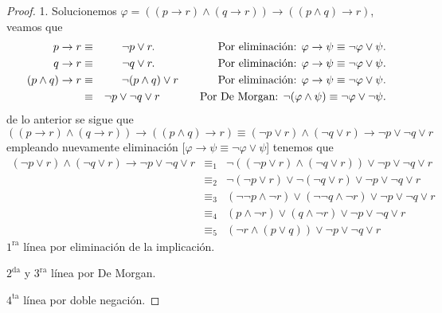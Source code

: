 \documentclass{article}
\begin{document}
\begin{itemize}
\begin{proof}
    1. Solucionemos $\varphi = ((p \rightarrow r) \land (q \rightarrow r)) \rightarrow ((p \land q) \rightarrow r)$,
    veamos que
    \begin{eqnarray*}
      p \rightarrow r &\equiv& \neg p \lor r.
      \hspace*{2cm} \text{Por eliminación: } \varphi \rightarrow \psi \equiv \neg \varphi \lor \psi.\\
      q \rightarrow r &\equiv& \neg q \lor r.
      \hspace*{2cm} \text{Por eliminación: } \varphi \rightarrow \psi \equiv \neg \varphi \lor \psi.\\
      (p \land q) \rightarrow r &\equiv& \neg (p \land q) \lor r
      \hspace*{1.25cm} \text{Por eliminación: } \varphi \rightarrow \psi \equiv \neg \varphi \lor \psi.\\
      &\equiv& \neg p \lor \neg q \lor r
      \hspace*{1.27cm} \text{Por De Morgan: } \neg (\varphi \land \psi) \equiv \neg \varphi \lor \neg \psi.\\
    \end{eqnarray*}
    de lo anterior se sigue que
    \[
    ((p \rightarrow r) \land (q \rightarrow r)) \rightarrow ((p \land q) \rightarrow r)
    \equiv (\neg p \lor r) \land (\neg q \lor r) \rightarrow \neg p \lor \neg q \lor r
    \]
    empleando nuevamente eliminación [$\varphi \rightarrow \psi \equiv \neg \varphi \lor \psi$]
    tenemos que
    \begin{eqnarray*}
    (\neg p \lor r) \land (\neg q \lor r) \rightarrow \neg p \lor \neg q \lor r &\equiv_{1}&
      \neg ((\neg p \lor r) \land (\neg q \lor r)) \lor \neg p \lor \neg q \lor r\\
      &\equiv_{2}& \neg (\neg p \lor r) \lor \neg (\neg q \lor r) \lor \neg p \lor \neg q \lor r\\
      &\equiv_{3}& (\neg\neg p \land \neg r) \lor (\neg\neg q \land \neg r) \lor \neg p \lor \neg q \lor r\\
      &\equiv_{4}& (p \land \neg r) \lor (q \land \neg r) \lor \neg p \lor \neg q \lor r\\
      &\equiv_{5}& (\neg r \land (p \lor q)) \lor \neg p \lor \neg q \lor r
    \end{eqnarray*}
    $1^{\text{ra}}$ línea por eliminación de la implicación.
    
    $2^{\text{da}}$ y $3^{\text{ra}}$ línea por De Morgan.
    
    $4^{\text{ta}}$ línea por doble negación.
    

\end{proof}
\end{itemize}
\end{document}
